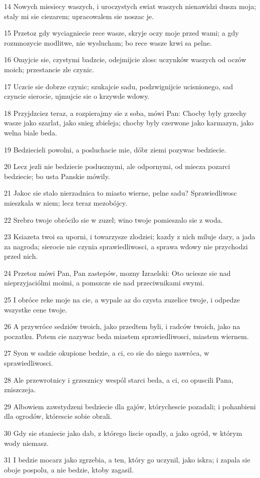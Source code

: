 \par 14 Nowych miesiecy waszych, i uroczystych swiat waszych nienawidzi dusza moja; staly mi sie ciezarem; upracowalem sie noszac je.
\par 15 Przetoz gdy wyciagniecie rece wasze, skryje oczy moje przed wami; a gdy rozmnozycie modlitwe, nie wyslucham; bo rece wasze krwi sa pelne.
\par 16 Omyjcie sie, czystymi badzcie, odejmijcie zlosc uczynków waszych od oczów moich; przestancie zle czynic.
\par 17 Uczcie sie dobrze czynic; szukajcie sadu, podzwignijcie ucisnionego, sad czyncie sierocie, ujmujcie sie o krzywde wdowy.
\par 18 Przyjdzciez teraz, a rozpierajmy sie z soba, mówi Pan: Chocby byly grzechy wasze jako szarlat, jako snieg zbieleja; chocby byly czerwone jako karmazyn, jako welna biale beda.
\par 19 Bedziecieli powolni, a posluchacie mie, dóbr ziemi pozywac bedziecie.
\par 20 Lecz jezli nie bedziecie poslusznymi, ale odpornymi, od miecza pozarci bedziecie; bo usta Panskie mówily.
\par 21 Jakoc sie stalo nierzadnica to miasto wierne, pelne sadu? Sprawiedliwosc mieszkala w niem; lecz teraz mezobójcy.
\par 22 Srebro twoje obrócilo sie w zuzel; wino twoje pomieszalo sie z woda.
\par 23 Ksiazeta twoi sa uporni, i towarzysze zlodziei; kazdy z nich miluje dary, a jada za nagroda; sierocie nie czynia sprawiedliwosci, a sprawa wdowy nie przychodzi przed nich.
\par 24 Przetoz mówi Pan, Pan zastepów, mozny Izraelski: Oto uciesze sie nad nieprzyjaciólmi moimi, a pomszcze sie nad przeciwnikami swymi.
\par 25 I obróce reke moje na cie, a wypale az do czysta zuzelice twoje, i odpedze wszystke cene twoje.
\par 26 A przywróce sedziów twoich, jako przedtem byli, i radców twoich, jako na poczatku. Potem cie nazywac beda miastem sprawiedliwosci, miastem wiernem.
\par 27 Syon w sadzie okupione bedzie, a ci, co sie do niego nawróca, w sprawiedliwosci.
\par 28 Ale przewrotnicy i grzesznicy wespól starci beda, a ci, co opuscili Pana, zniszczeja.
\par 29 Albowiem zawstydzeni bedziecie dla gajów, którychescie pozadali; i pohanbieni dla ogrodów, którescie sobie obrali.
\par 30 Gdy sie staniecie jako dab, z którego liscie opadly, a jako ogród, w którym wody niemasz.
\par 31 I bedzie mocarz jako zgrzebia, a ten, który go uczynil, jako iskra; i zapala sie oboje pospolu, a nie bedzie, ktoby zagasil.

